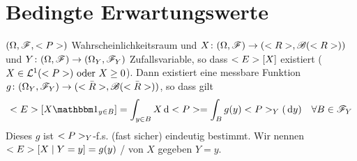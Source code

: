 ﻿\section{Bedingte Erwartungswerte}
\begin{proposition}
	$(\O, \F, \P)$ Wahrscheinlichkeitsraum und $X\colon (\O,\F) \to (\R, \borel(\R))$ und $Y\colon (\O,\F) \to (\O_Y, \F_Y)$ Zufallsvariable, so dass $\E[X]$ existiert ($X \in \Ln{1}(\P) \oder X \ge 0$). Dann existiert eine messbare Funktion $g\colon (\O_Y, \F_Y) \to (\bar{\R}, \borel(\bar{\R}))$, so dass gilt
	\begin{align*}
		\E[X\indi_{y\in B}]=\int_{y \in B} X \d \P = \int_B g(y) \P_Y(\d y) \quad \forall B \in \F_Y
	\end{align*}
	Dieses $g$ ist $\P_Y$-f.s. (fast sicher) eindeutig bestimmt. Wir nennen $\E[X \mid Y = y] = g(y)$ / von $X$ gegeben $Y=y$.
\end{proposition}
